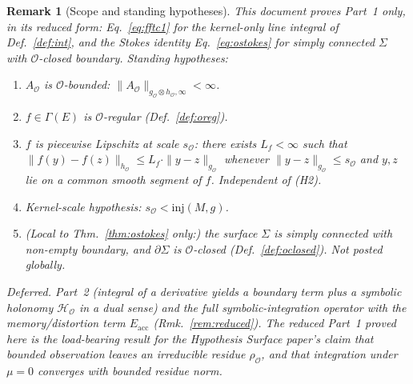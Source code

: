 \documentclass[11pt]{article}
\newtheorem{remark}{Remark}
\newcommand{\sO}{s_{\mathcal{O}}}  %
\newcommand{\Obs}{\mathcal{O}}
\newcommand{\HolO}{\mathcal{H}_{\Obs}}
\newcommand{\resO}{\rho_{\Obs}}
\newcommand{\AO}{A_{\Obs}}
\newcommand{\gO}{g_{\Obs}}
\newcommand{\hO}{h_{\Obs}}
\newcommand{\mask}{\mu}
\newcommand{\EE}{E}
\newcommand{\Sect}{\Gamma}
\begin{document}
\begin{remark}[Scope and standing hypotheses]
\label{rem:scope}
This document proves Part~1 only, in its reduced form:
Eq.~\eqref{eq:fftc1} for the kernel-only line integral of
Def.~\ref{def:int}, and the Stokes identity Eq.~\eqref{eq:ostokes}
for simply connected $\Sigma$ with $\Obs$-closed boundary. Standing
hypotheses:
\begin{enumerate}[label=(H\arabic*)]
\item $\AO$ is $\Obs$-bounded: $\|\AO\|_{\gO \otimes \hO, \infty} < \infty$.
\item $f \in \Sect(\EE)$ is $\Obs$-regular (Def.~\ref{def:oreg}).
\item $f$ is \emph{piecewise Lipschitz at scale $\sO$}: there
exists $L_f < \infty$ such that
$\|f(y) - f(z)\|_{\hO} \leq L_f \cdot \|y - z\|_{\gO}$ whenever
$\|y - z\|_{\gO} \leq \sO$ and $y, z$ lie on a common smooth
segment of $f$. Independent of (H2).
\item Kernel-scale hypothesis: $\sO < \mathrm{inj}(M, g)$.
\item (Local to Thm.~\ref{thm:ostokes} only:) the surface $\Sigma$
is simply connected with non-empty boundary, and $\partial\Sigma$ is
$\Obs$-closed (Def.~\ref{def:oclosed}). Not posted globally.
\end{enumerate}
\emph{Deferred.} Part~2 (integral of a derivative yields a boundary
term plus a symbolic holonomy $\HolO$ in a dual sense) and the full
symbolic-integration operator with the memory\slash distortion term
$E_{\mathrm{acc}}$ (Rmk.~\ref{rem:reduced}). The reduced Part~1
proved here is the load-bearing result for the Hypothesis Surface
paper's claim that bounded observation leaves an irreducible residue
$\resO$, and that integration under $\mask = 0$ converges with
bounded residue norm.
\end{remark}
\end{document}
